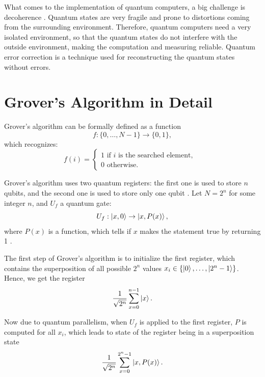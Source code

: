 \documentclass[english,oneside,openright]{UH_DS_report}
\begin{document}
What comes to the implementation of quantum computers, a big challenge is decoherence \cite{introtoqc}. Quantum states are very fragile and prone to distortions coming from the surrounding environment. Therefore, quantum computers need a very isolated environment, so that the quantum states do not interfere with the outside environment, making the computation and measuring reliable. Quantum error correction is a technique used for reconstructing the quantum states without errors.

\section{Grover's Algorithm in Detail}
\label{detailedgrover}

Grover's algorithm can be formally defined as a function \cite{lavor2003grover}
\begin{equation}
    f : \{ 0, \ldots, N - 1 \} \rightarrow \{0, 1\},
\end{equation}
which recognizes:
\begin{equation}    
f(i) = 
\begin{cases}
    1 \textrm{ if $i$ is the searched element,} & \\ 0 \textrm{ otherwise.}
\end{cases}
\end{equation}

Grover's algorithm uses two quantum registers: the first one is used to store $n$ qubits, and the second one is used to store only one qubit \cite{lavor2003grover}. Let $N = 2^{n}$ for some integer $n$, and $U_{f}$ a quantum gate:
\[U_{f} : \ket{x, 0} \rightarrow \ket{x, P(x)},\]
where $P(x)$ is a function, which tells if $x$ makes the statement true by returning 1 \cite{introtoqc}.

The first step of Grover's algorithm is to initialize the first register, which contains the superposition of all possible $2^{n}$ values $x_{i} \in \{\ket{0}, \ldots, \ket{2^{n} - 1}\}$. Hence, we get the register
\begin{equation}
\label{eqn: 1}
    \frac{1}{\sqrt{2^{n}}}\sum_{x = 0}^{n - 1}\ket{x} .
\end{equation}

Now due to quantum parallelism, when $U_{f}$ is applied to the first register, $P$ is computed for all $x_{i}$, which leads to state of the register being in a superposition state
\begin{equation}
\label{eqn: 2}
\frac{1}{\sqrt{2^{n}}}\sum_{x = 0}^{2^{n} - 1}\ket{x, P(x)}.    
\end{equation}
\end{document}
